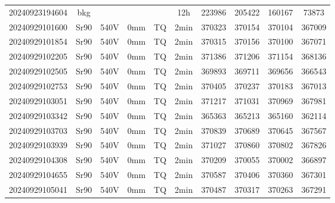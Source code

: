 \begin{center}
{\begin{longtable}{c c c c c c c c c c}
    20240923194604 & bkg &  &  &  & 12h & 223986 & 205422 & 160167 & 73873 \\
    20240929101600 & Sr90 & 540V & 0mm & TQ & 2min & 370323 & 370154 & 370104 & 367009 \\
    20240929101854 & Sr90 & 540V & 0mm & TQ & 2min & 370315 & 370156 & 370100 & 367071 \\
    20240929102205 & Sr90 & 540V & 0mm & TQ & 2min & 371386 & 371206 & 371154 & 368136 \\
    20240929102505 & Sr90 & 540V & 0mm & TQ & 2min & 369893 & 369711 & 369656 & 366543 \\
    20240929102753 & Sr90 & 540V & 0mm & TQ & 2min & 370405 & 370237 & 370183 & 367013 \\
    20240929103051 & Sr90 & 540V & 0mm & TQ & 2min & 371217 & 371031 & 370969 & 367981 \\
    20240929103342 & Sr90 & 540V & 0mm & TQ & 2min & 365363 & 365213 & 365160 & 362114 \\
    20240929103703 & Sr90 & 540V & 0mm & TQ & 2min & 370839 & 370689 & 370645 & 367567 \\
    20240929103939 & Sr90 & 540V & 0mm & TQ & 2min & 371027 & 370860 & 370802 & 367826 \\
    20240929104308 & Sr90 & 540V & 0mm & TQ & 2min & 370209 & 370055 & 370002 & 366897 \\
    20240929104655 & Sr90 & 540V & 0mm & TQ & 2min & 370587 & 370406 & 370360 & 367301 \\
    20240929105041 & Sr90 & 540V & 0mm & TQ & 2min & 370487 & 370317 & 370263 & 367291 \\

\end{longtable}
}
\end{center}

